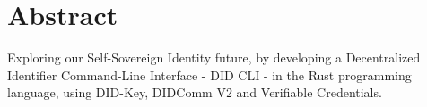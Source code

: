\chapter*{Abstract}

Exploring our Self-Sovereign Identity future, by developing a Decentralized Identifier Command-Line Interface - DID CLI - in the Rust programming language, using DID-Key, DIDComm V2 and Verifiable Credentials.